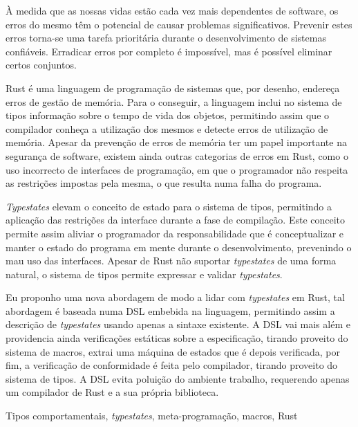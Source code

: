 

À medida que as nossas vidas estão cada vez mais dependentes de software,
os erros do mesmo têm o potencial de causar problemas significativos.
Prevenir estes erros torna-se uma tarefa prioritária durante o desenvolvimento de sistemas confiáveis.
Erradicar erros por completo é impossível, mas é possível eliminar certos conjuntos.

Rust é uma linguagem de programação de sistemas que, por desenho, endereça erros de gestão de memória.
Para o conseguir, a linguagem inclui no sistema de tipos informação sobre o tempo de vida dos objetos,
permitindo assim que o compilador conheça a utilização dos mesmos e detecte erros de utilização de memória.
Apesar da prevenção de erros de memória ter um papel importante na segurança de software,
existem ainda outras categorias de erros em Rust,
como o uso incorrecto de interfaces de programação, em que o programador não respeita as restrições impostas pela mesma, o que resulta numa falha do programa.

\emph{Typestates} elevam o conceito de estado para o sistema de tipos,
permitindo a aplicação das restrições da interface durante a fase de compilação.
Este conceito permite assim aliviar o programador da responsabilidade que é conceptualizar e manter o estado do programa em mente durante o desenvolvimento, prevenindo o mau uso das interfaces.
Apesar de Rust não suportar \emph{typestates} de uma forma natural,
o sistema de tipos permite expressar e validar \emph{typestates}.

Eu proponho uma nova abordagem de modo a lidar com \emph{typestates} em Rust,
tal abordagem é baseada numa DSL embebida na linguagem,
permitindo assim a descrição de \emph{typestates} usando apenas a sintaxe existente.
A DSL vai mais além e providencia ainda verificações estáticas sobre a especificação,
tirando proveito do sistema de macros, extrai uma máquina de estados que é depois verificada,
por fim, a verificação de conformidade é feita pelo compilador, tirando proveito do sistema de tipos.
A DSL evita poluição do ambiente trabalho, requerendo apenas um compilador de Rust e a sua própria biblioteca.


\begin{keywords}
Tipos comportamentais, \emph{typestates}, meta-programação, macros, Rust
\end{keywords}
